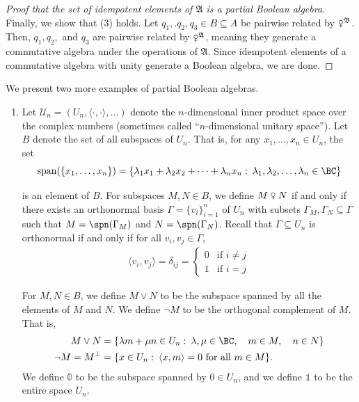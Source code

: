 \documentclass{scrartcl}
\newcommand{\FA}{\mathfrak{A}}
\newcommand{\FB}{\mathfrak{B}}
\newcommand{\com}{\mathrel{\venus}}
\begin{document}
\begin{example}
\begin{proof}[Proof that the set of idempotent elements of $\FA$ is a partial Boolean algebra]
Finally, we show that (3) holds. Let $q_1,.q_2,q_3\in B\subseteq A$ be pairwise related by $\com^{\FB}$. Then, $q_1,q_2,$ and $q_3$ are pairwise related by $\com^{\FA}$, meaning they generate a commutative algebra under the operations of $\FA$. Since idempotent elements of a commutative algebra with unity generate a Boolean algebra, we are done.

\end{proof}

\end{example}

We present two more examples of partial Boolean algebras.

\begin{examples}
\begin{enumerate}
\item
Let $\mathscr{U}_n=(U_n,\langle\cdot,\cdot\rangle,\ldots)$ denote the $n$-dimensional inner product space over the complex numbers (sometimes called ``$n$-dimensional unitary space''). Let $B$ denote the set of all subspaces of $U_n$. That is, for any $x_1,\ldots,x_n\in U_n$, the set
\[
\operatorname{span}(\{x_1,\ldots,x_n\})=\{\lambda_1x_1+\lambda_2x_2+\cdots+\lambda_nx_n\,\colon\,\lambda_1,\lambda_2,\ldots,\lambda_n\in\BC\}
\]

is an element of $B$. For subspaces $M,N\in B$, we define $M\com N$ if and only if there exists an orthonormal basis $\Gamma=\{v_i\}_{i=1}^n$ of $U_n$ with subsets $\Gamma_M,\Gamma_N\subseteq\Gamma$ such that $M=\spn(\Gamma_M)$ and $N=\spn(\Gamma_N)$. Recall that $\Gamma\subseteq U_n$ is orthonormal if and only if for all $v_i,v_j\in\Gamma$,
\begin{align*}
\langle v_i,v_j\rangle=\delta_{ij}=
\begin{cases}
0 & \text{if } i\ne j\\
1 & \text{if } i=j
\end{cases}
\end{align*}

For $M,N\in B$, we define $M\lor N$ to be the subspace spanned by all the elements of $M$ and $N$. We define $\neg M$ to be the orthogonal complement of $M$. That is,
\begin{align*}
M\lor N&=\{\lambda m+\mu n\in U_n\,\colon\,\lambda,\mu\in\BC,\quad m\in M,\quad n\in N\}\\
\neg M=M^{\perp}&=\{x\in U_n\,\colon\,\langle x,m\rangle=0\text{ for all }m\in M\}.
\end{align*}
We define $\mathbb{0}$ to be the subspace spanned by $0\in U_n$, and we define $\mathbb{1}$ to be the entire space $U_n$.


\end{enumerate}
\end{examples}
\end{document}
